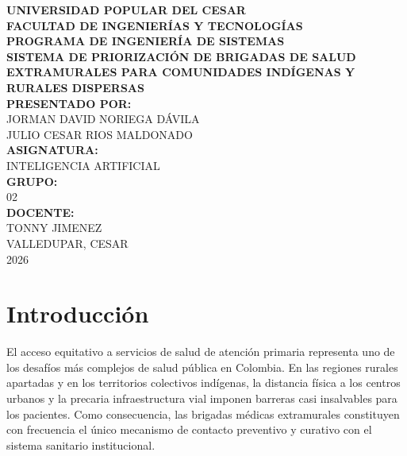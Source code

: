 \documentclass[12pt]{article}
\begin{document}
\hypersetup{pageanchor=false}
\begin{titlepage}
    \centering
    
    {\normalsize \textbf{UNIVERSIDAD POPULAR DEL CESAR}}\\[0.3cm]
    {\normalsize \textbf{FACULTAD DE INGENIERÍAS Y TECNOLOGÍAS}}\\[0.3cm]
    {\normalsize \textbf{PROGRAMA DE INGENIERÍA DE SISTEMAS}}\\[2.0cm]
    
    {\large \textbf{SISTEMA DE PRIORIZACIÓN DE BRIGADAS DE SALUD EXTRAMURALES PARA COMUNIDADES INDÍGENAS Y RURALES DISPERSAS}}\\[0.6cm]
    
    
    {\normalsize \textbf{PRESENTADO POR:}}\\[0.4cm]
    {\normalsize JORMAN DAVID NORIEGA DÁVILA}\\
    {\normalsize JULIO CESAR RIOS MALDONADO}\\[1.0cm]
    
    {\normalsize \textbf{ASIGNATURA:}}\\
    {\normalsize INTELIGENCIA ARTIFICIAL}\\[0.4cm]
    
    {\normalsize \textbf{GRUPO:}}\\
    {\normalsize 02}\\[0.4cm]
    
    {\normalsize \textbf{DOCENTE:}}\\
    {\normalsize TONNY JIMENEZ}\\[1.5cm]
    
    {\normalsize VALLEDUPAR, CESAR}\\
    {\normalsize 2026}
    
\end{titlepage}
\hypersetup{pageanchor=true}

\tableofcontents
\newpage

\section{Introducción}
El acceso equitativo a servicios de salud de atención primaria representa uno de los desafíos más complejos de salud pública en Colombia. En las regiones rurales apartadas y en los territorios colectivos indígenas, la distancia física a los centros urbanos y la precaria infraestructura vial imponen barreras casi insalvables para los pacientes. Como consecuencia, las brigadas médicas extramurales constituyen con frecuencia el único mecanismo de contacto preventivo y curativo con el sistema sanitario institucional.
\end{document}
